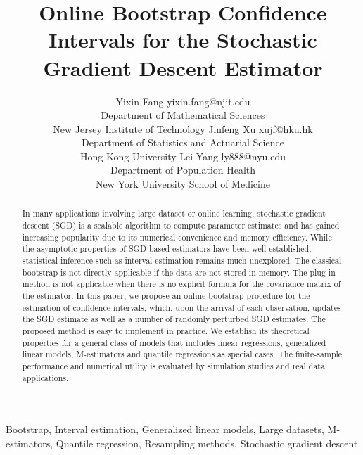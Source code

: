 \documentclass[twoside,11pt]{article}
\begin{document}
\title{Online Bootstrap Confidence Intervals for the Stochastic Gradient Descent Estimator}

\author{\name Yixin Fang \email yixin.fang@njit.edu \\
       \addr Department of Mathematical Sciences\\
       New Jersey Institute of Technology
       \AND
       \name Jinfeng Xu \email xujf@hku.hk \\
       \addr Department of Statistics and Actuarial Science \\
       Hong Kong University
       \AND
       \name Lei Yang \email ly888@nyu.edu \\
       \addr Department of Population Health \\
       New York University School of Medicine
       }


\maketitle

\begin{abstract}%
In many applications involving large dataset or online learning, stochastic gradient descent (SGD) is a scalable algorithm to compute parameter estimates and has gained increasing popularity due to its numerical convenience and memory efficiency. While the asymptotic properties of SGD-based estimators have been well established, statistical inference such as interval estimation remains much unexplored.  The classical bootstrap is not directly applicable if the data are not stored in memory. The plug-in method is not applicable when there is no explicit formula for the covariance matrix of the estimator. In this paper, we propose an online bootstrap procedure for the estimation of confidence intervals, which, upon the arrival of each observation, updates the SGD estimate as well as a number of randomly perturbed SGD estimates. The proposed method is easy to implement in practice. We establish its theoretical properties for a general class of models that includes linear regressions, generalized linear models, M-estimators and quantile regressions as special cases. The finite-sample performance and numerical utility is evaluated by simulation studies and real data applications.
\end{abstract}

\begin{keywords}
Bootstrap, Interval estimation, Generalized linear models, Large datasets, M-estimators, Quantile regression, Resampling methods, Stochastic gradient descent
\end{keywords}
\end{document}

